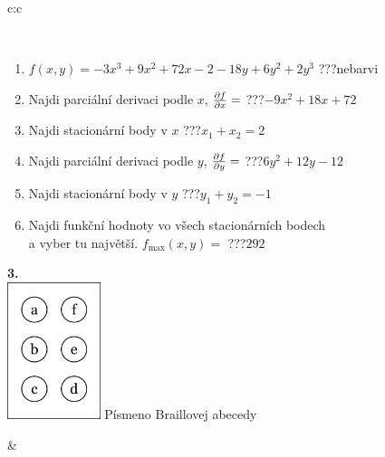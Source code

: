 \documentclass[10pt]{report}
\begin{document}
\begin{tabular}{c:c}
\begin{minipage}[c][104.5mm][t]{0.5\linewidth}
\begin{center}
\begin{minipage}{0.95\linewidth}
\begin{center}
\end{center}
\end{minipage}
\\[1mm]
\begin{minipage}{0.79\linewidth}
\begin{center}
\begin{varwidth}{\linewidth}
\begin{enumerate}
\normalsize
\item $f(x,y)=-3x^3+9x^2+72x-2-18y+6y^2+2y^3$\quad \dotfill\; ???\;\dotfill \quad nebarvi
\item Najdi parciální derivaci podle $x$, $\pdv{f}{x}=$\quad \dotfill\; ???\;\dotfill \quad $-9x^2+18x+72$
\item Najdi stacionární body v $x$\quad \dotfill\; ???\;\dotfill \quad $x_1+x_2=2$
\item Najdi parciální derivaci podle $y$, $\pdv{f}{y}=$\quad \dotfill\; ???\;\dotfill \quad $6y^2+12y-12$
\item Najdi stacionární body v $y$\quad \dotfill\; ???\;\dotfill \quad $y_1+y_2=-1$
\item Najdi funkční hodnoty vo všech stacionárních bodech \\ \phantom{xxxxxx} a vyber tu najvětší. $f_{\text{max}}(x,y)=$\quad \dotfill\; ???\;\dotfill \quad $292$
\end{enumerate}
\end{varwidth}
\end{center}
\end{minipage}
\begin{minipage}{0.20\linewidth}
\begin{center}
{\Huge\bfseries 3.} \\[2mm]
\includegraphics[height=40mm]{../images/braille.png}
{\small Písmeno Braillovej abecedy}
\end{center}
\end{minipage}
\end{center}
\end{minipage}
&
\begin{minipage}[c][104.5mm][t]{0.5\linewidth}
\begin{center}

\end{center}
\end{minipage}
\end{tabular}
\end{document}
